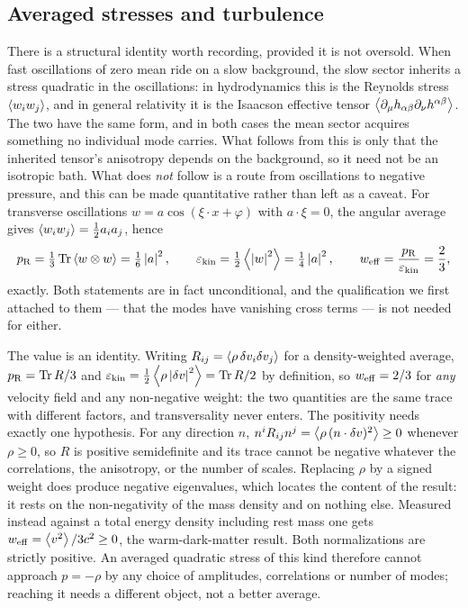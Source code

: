 \subsection{Averaged stresses and turbulence}\label{sec:outlook-turbulence}

There is a structural identity worth recording, provided it is not oversold.
When fast oscillations of zero mean ride on a slow background, the slow sector
inherits a stress quadratic in the oscillations: in hydrodynamics this is the
Reynolds stress $\left\langle w_iw_j \right\rangle$, and in general relativity it is the Isaacson
effective tensor $\left\langle \partial_\mu h_{\alpha\beta}\partial_\nu h^{\alpha\beta} \right\rangle$.
The two have the same form, and in both cases the mean sector acquires
something no individual mode carries. What follows from this is only that the
inherited tensor's anisotropy depends on the background, so it need not be an
isotropic bath. What does \emph{not} follow is a route from oscillations to
negative pressure, and this can be made quantitative rather than left as a
caveat. For transverse oscillations $w=a\cos(\xi\cdot x+\varphi)$ with
$a\cdot\xi=0$, the angular average gives
$\left\langle w_iw_j \right\rangle=\tfrac12a_ia_j$, hence
%
\begin{equation}\label{eq:outlook-reynolds-eos}
  p_{\rm R}=\tfrac13\operatorname{Tr}\left\langle w\otimes w \right\rangle=\tfrac16\left|a\right|^2,
  \qquad
  \varepsilon_{\rm kin}=\tfrac12\left\langle \left|w\right|^2 \right\rangle=\tfrac14\left|a\right|^2,
  \qquad
  w_{\rm eff}=\frac{p_{\rm R}}{\varepsilon_{\rm kin}}=\frac23 ,
\end{equation}
%
exactly. Both statements are in fact unconditional, and the qualification we
first attached to them --- that the modes have vanishing cross terms --- is not
needed for either.

The value is an identity. Writing $R_{ij}=\left\langle \rho\,\delta v_i\delta v_j \right\rangle$ for
a density-weighted average, $p_{\rm R}=\operatorname{Tr} R/3$ and
$\varepsilon_{\rm kin}=\tfrac12\left\langle \rho\left|\delta v\right|^2 \right\rangle=\operatorname{Tr} R/2$ by
definition, so $w_{\rm eff}=2/3$ for \emph{any} velocity field and any
non-negative weight: the two quantities are the same trace with different
factors, and transversality never enters. The positivity needs exactly one
hypothesis. For any direction $n$,
$n^iR_{ij}n^j=\left\langle \rho\,(n\cdot\delta v)^2 \right\rangle\ge0$ whenever $\rho\ge0$, so $R$ is
positive semidefinite and its trace cannot be negative whatever the
correlations, the anisotropy, or the number of scales. Replacing $\rho$ by a
signed weight does produce negative eigenvalues, which locates the content of
the result: it rests on the non-negativity of the mass density and on nothing
else. Measured instead against a total energy density including rest mass
one gets $w_{\rm eff}=\left\langle v^2 \right\rangle/3c^2\ge0$, the warm-dark-matter result. Both
normalizations are strictly positive. An averaged quadratic stress of this kind
therefore cannot approach $p=-\rho$ by any choice of amplitudes, correlations or
number of modes; reaching it needs a different object, not a better average.


